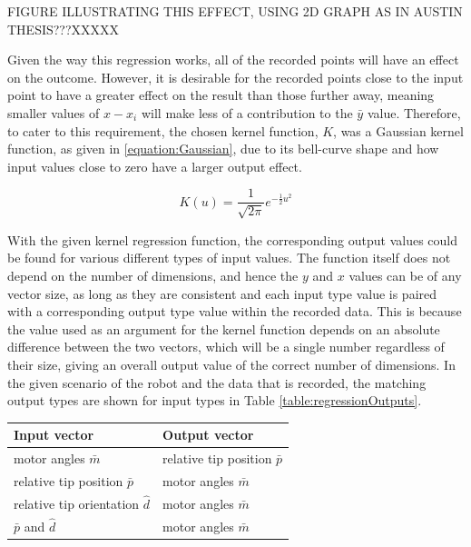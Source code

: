 \documentclass[11pt]{article}
\begin{document}
FIGURE ILLUSTRATING THIS EFFECT, USING 2D GRAPH AS IN AUSTIN THESIS???XXXXX

Given the way this regression works, all of the recorded points will have an effect on the outcome. However, it is desirable for the recorded points close to the input point to have a greater effect on the result than those further away, meaning smaller values of $x - x_{i}$ will make less of a contribution to the $\bar{y}$ value. Therefore, to cater to this requirement, the chosen kernel function, $K$, was a Gaussian kernel function, as given in \eqref{equation:Gaussian}, due to its bell-curve shape and how input values close to zero have a larger output effect.

\begin{equation}\label{equation:Gaussian}
K(u) = \frac{1}{\sqrt{2\pi}}e^{-\frac{1}{2}u^2}
\end{equation}

With the given kernel regression function, the corresponding output values could be found for various different types of input values. The function itself does not depend on the number of dimensions, and hence the $y$ and $x$ values can be of any vector size, as long as they are consistent and each input type value is paired with a corresponding output type value within the recorded data. This is because the value used as an argument for the kernel function depends on an absolute difference between the two vectors, which will be a single number regardless of their size, giving an overall output value of the correct number of dimensions. In the given scenario of the robot and the data that is recorded, the matching output types are shown for input types in Table \ref{table:regressionOutputs}.

\begin{center}
\label{table:regressionOutputs}
\begin{tabularx}{0.66\textwidth}{ | >{\centering\arraybackslash}p{12em} |>{\centering\arraybackslash}X|} 
\hline
Input vector & Output vector\\
\hline
motor angles $\bar{m}$ & relative tip position $\bar{p}$ \\
relative tip position $\bar{p}$ & motor angles $\bar{m}$ \\
relative tip orientation $\hat{d}$ & motor angles $\bar{m}$ \\
$\bar{p}$ and $\hat{d}$ & motor angles $\bar{m}$\\
\hline
\end{tabularx}
\end{center}
\end{document}
